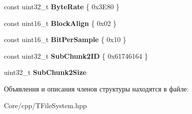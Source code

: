 \begin{DoxyCompactItemize}
const uint32\+\_\+t {\bfseries Byte\+Rate} \{ 0x3\+E80 \}
\item 
\mbox{\label{struct_w_a_v_e___format_type_def_a54dbceb93d3c8e6c5fc8abe656814f93}} 
const uint16\+\_\+t {\bfseries Block\+Align} \{ 0x02 \}
\item 
\mbox{\label{struct_w_a_v_e___format_type_def_a301883744fb8bcbd48f5330637e56ffc}} 
const uint16\+\_\+t {\bfseries Bit\+Per\+Sample} \{ 0x10 \}
\item 
\mbox{\label{struct_w_a_v_e___format_type_def_a775aa21eb108eac6501f57dd8f5f3a3d}} 
const uint32\+\_\+t {\bfseries Sub\+Chunk2\+ID} \{ 0x61746164 \}
\item 
\mbox{\label{struct_w_a_v_e___format_type_def_ac5e22f09d20598d46149e2f5d290c0c7}} 
uint32\+\_\+t {\bfseries Sub\+Chunk2\+Size}
\end{DoxyCompactItemize}


Объявления и описания членов структуры находятся в файле\+:\begin{DoxyCompactItemize}
\item 
Core/cpp/T\+File\+System.\+hpp\end{DoxyCompactItemize}
